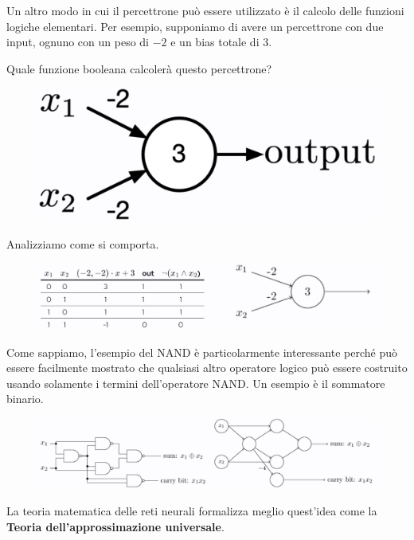 Un altro modo in cui il percettrone può essere utilizzato è il calcolo delle funzioni logiche elementari. Per esempio, supponiamo di avere un percettrone con due input, ognuno con un peso di $-2$ e un bias totale di $3$.



Quale funzione booleana calcolerà questo percettrone?
\begin{figure}[!h]
    \includegraphics[scale=.4]{images/gradient_descent/perc_logic.png}
    \centering
\end{figure}
\newpage


Analizziamo come si comporta.
\begin{figure}[!h]
    \includegraphics[scale=.7]{images/gradient_descent/nand.png}
    \centering
\end{figure}



Come sappiamo, l’esempio del NAND è particolarmente interessante perché può essere facilmente mostrato che qualsiasi altro operatore logico può essere costruito usando solamente i termini dell’operatore NAND.
Un esempio è il sommatore binario. 
\begin{figure}[!h]
    \includegraphics[width=170mm]{images/gradient_descent/bin_adder.png}
    \centering
\end{figure}



La teoria matematica delle reti neurali formalizza meglio quest’idea come la \textbf{Teoria dell’approssimazione universale}.

